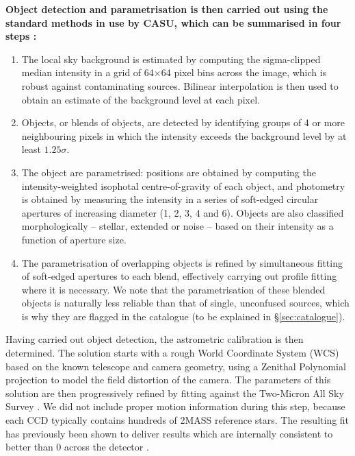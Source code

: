 \documentclass[a4paper,useAMS,usenatbib]{mn2e}
\begin{document}
{ \bf
Object detection and parametrisation is then carried out
using the standard methods in use by CASU,
which can be summarised in four steps
\citep[a discussion on each of these steps
and related points can be found in][]{Irwin1985,Irwin1997}:
\begin{enumerate}
\item The local sky background is estimated
by computing the sigma-clipped median intensity
in a grid of 64$\times$64 pixel bins across the image,
which is robust against contaminating sources.
Bilinear interpolation is then used to obtain an estimate 
of the background level at each pixel.
\item Objects, or blends of objects, are detected
by identifying groups of 4 or more neighbouring pixels
in which the intensity exceeds the background level by at least $1.25\sigma$.
\item The object are parametrised:
positions are obtained by computing 
the intensity-weighted isophotal centre-of-gravity
of each object,
and photometry is obtained 
by measuring the intensity
in a series of soft-edged circular apertures of increasing diameter 
(1, 2, 3, 4 and 6).
Objects are also classified morphologically
-- stellar, extended or noise --
based on their intensity as a function of aperture size.
\item The parametrisation of overlapping objects
is refined by simultaneous fitting of
soft-edged apertures to each blend,
effectively carrying out profile fitting where it is necessary.
We note that the parametrisation of these blended objects is naturally
less reliable than that of single, unconfused sources,
which is why they are flagged in the catalogue
(to be explained in \S\ref{sec:catalogue}).
\end{enumerate}

Having carried out object detection,
the astrometric calibration is then determined.
The solution starts with a rough 
World Coordinate System (WCS)
based on the known telescope and camera geometry,
using a Zenithal Polynomial projection
\citep[ZPN;][]{Calabretta2002}
to model the field distortion of the camera.
The parameters of this solution
are then progressively refined by fitting against the
Two-Micron All Sky Survey \citep[2MASS; ][]{Skrutskie2006}.
We did not include proper motion information during this step,
because each CCD typically contains
hundreds of 2MASS reference stars.
The resulting fit has previously been shown
to deliver results which are internally consistent
to better than 0 across the detector
\citep{Gonzalez-Solares2008}.

}
\end{document}
